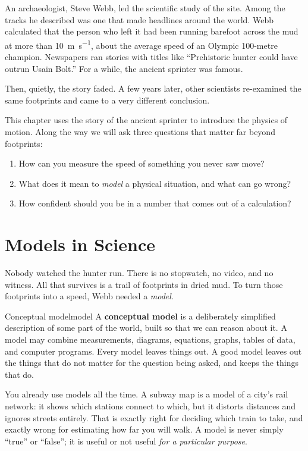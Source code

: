 \documentclass[11pt,twoside,openany]{book}
\begin{document}
An archaeologist, Steve Webb, led the scientific study of the site. Among the tracks he described was one that made headlines around the world. Webb calculated that the person who left it had been running barefoot across the mud at more than \SI{10}{\metre\per\second}, about the average speed of an Olympic 100-metre champion. Newspapers ran stories with titles like ``Prehistoric hunter could have outrun Usain Bolt.'' For a while, the ancient sprinter was famous.

Then, quietly, the story faded. A few years later, other scientists re-examined the same footprints and came to a very different conclusion.

This chapter uses the story of the ancient sprinter to introduce the physics of motion. Along the way we will ask three questions that matter far beyond footprints:
\begin{enumerate}
  \item How can you measure the speed of something you never saw move?
  \item What does it mean to \emph{model} a physical situation, and what can go wrong?
  \item How confident should you be in a number that comes out of a calculation?
\end{enumerate}

\section{Models in Science}

Nobody watched the hunter run. There is no stopwatch, no video, and no witness. All that survives is a trail of footprints in dried mud. To turn those footprints into a speed, Webb needed a \emph{model}.

\begin{definition}{Conceptual model}{model}
A \textbf{conceptual model} is a deliberately simplified description of some part of the world, built so that we can reason about it. A model may combine measurements, diagrams, equations, graphs, tables of data, and computer programs. Every model leaves things out. A good model leaves out the things that do not matter for the question being asked, and keeps the things that do.
\end{definition}

You already use models all the time. A subway map is a model of a city's rail network: it shows which stations connect to which, but it distorts distances and ignores streets entirely. That is exactly right for deciding which train to take, and exactly wrong for estimating how far you will walk. A model is never simply ``true'' or ``false''; it is useful or not useful \emph{for a particular purpose}.
\end{document}
